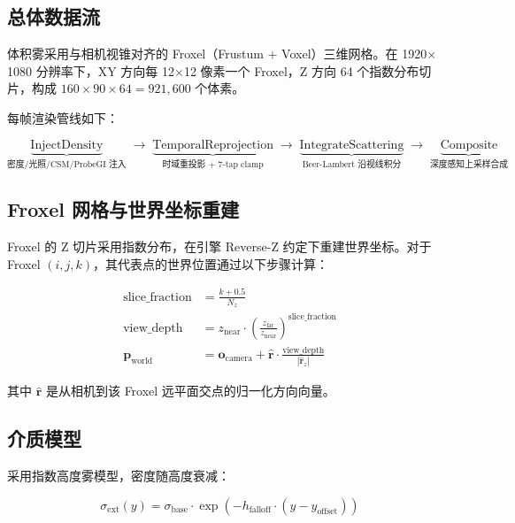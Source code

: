 \documentclass[11pt,a4paper]{article}
\begin{document}
\subsection{总体数据流}

体积雾采用与相机视锥对齐的 Froxel（Frustum + Voxel）三维网格。在 1920$\times$1080 分辨率下，XY 方向每 12$\times$12 像素一个 Froxel，Z 方向 64 个指数分布切片，构成 $160\times90\times64 = 921{,}600$ 个体素。

每帧渲染管线如下：

\begin{equation*}
\underbrace{\text{InjectDensity}}_{\text{密度/光照/CSM/ProbeGI 注入}}
\;\longrightarrow\;
\underbrace{\text{TemporalReprojection}}_{\text{时域重投影 + 7-tap clamp}}
\;\longrightarrow\;
\underbrace{\text{IntegrateScattering}}_{\text{Beer-Lambert 沿视线积分}}
\;\longrightarrow\;
\underbrace{\text{Composite}}_{\text{深度感知上采样合成}}
\end{equation*}

\subsection{Froxel 网格与世界坐标重建}

Froxel 的 Z 切片采用指数分布，在引擎 Reverse-Z 约定下重建世界坐标。对于 Froxel $(i, j, k)$，其代表点的世界位置通过以下步骤计算：

\begin{align}
\text{slice\_fraction} &= \frac{k + 0.5}{N_z} \\
\text{view\_depth} &= z_{\text{near}} \cdot \left(\frac{z_{\text{far}}}{z_{\text{near}}}\right)^{\text{slice\_fraction}} \\
\mathbf{p}_{\text{world}} &= \mathbf{o}_{\text{camera}} + \hat{\mathbf{r}} \cdot \frac{\text{view\_depth}}{|\hat{\mathbf{r}}_z|}
\end{align}

其中 $\hat{\mathbf{r}}$ 是从相机到该 Froxel 远平面交点的归一化方向向量。

\subsection{介质模型}

采用指数高度雾模型，密度随高度衰减：

\begin{equation}
\sigma_{\text{ext}}(y) = \sigma_{\text{base}} \cdot \exp\left(-h_{\text{falloff}} \cdot (y - y_{\text{offset}})\right)
\end{equation}
\end{document}
